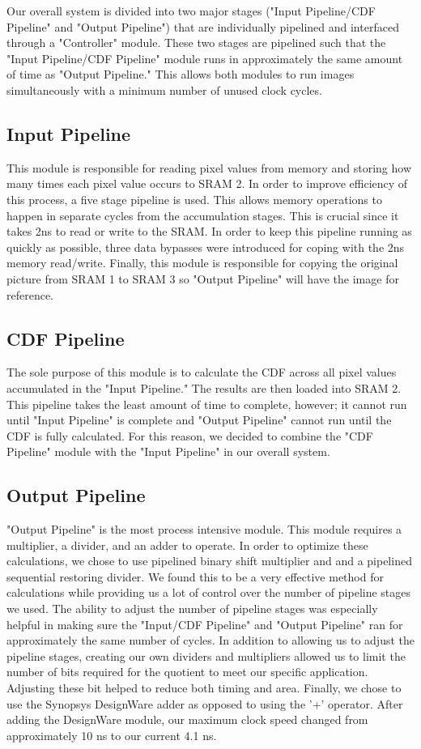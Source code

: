 \documentclass[10pt]{IEEEtran}
\begin{document}
Our overall system is divided into two major stages ("Input Pipeline/CDF Pipeline" and "Output Pipeline") that are individually pipelined and interfaced through a "Controller" module. These two stages are pipelined such that the "Input Pipeline/CDF Pipeline" module runs in approximately the same amount of time as "Output Pipeline." This allows both modules to run images simultaneously with a minimum number of unused clock cycles.

\subsection*{Input Pipeline}
This module is responsible for reading pixel values from memory and storing how many times each pixel value occurs to SRAM 2. In order to improve efficiency of this process, a five stage pipeline is used. This allows memory operations to happen in separate cycles from the accumulation stages. This is crucial since it takes 2ns to read or write to the SRAM. In order to keep this pipeline running as quickly as possible, three data bypasses were introduced for coping with the 2ns memory read/write. Finally, this module is responsible for copying the original picture from SRAM 1 to SRAM 3 so "Output Pipeline" will have the image for reference.

\subsection*{CDF Pipeline}
The sole purpose of this module is to calculate the CDF across all pixel values accumulated in the "Input Pipeline." The results are then loaded into SRAM 2. This pipeline takes the least amount of time to complete, however; it cannot run until "Input Pipeline" is complete and "Output Pipeline" cannot run until the CDF is fully calculated. For this reason, we decided to combine the "CDF Pipeline" module with the "Input Pipeline" in our overall system.

\subsection*{Output Pipeline}
"Output Pipeline" is the most process intensive module. This module requires a multiplier, a divider, and an adder to operate. In order to optimize these calculations, we chose to use pipelined binary shift multiplier and and a pipelined sequential restoring divider. We found this to be a very effective method for calculations while providing us a lot of control over the number of pipeline stages we used. The ability to adjust the number of pipeline stages was especially helpful in making sure the "Input/CDF Pipeline" and "Output Pipeline" ran for approximately the same number of cycles. In addition to allowing us to adjust the pipeline stages, creating our own dividers and multipliers allowed us to limit the number of bits required for the quotient to meet our specific application. Adjusting these bit helped to reduce both timing and area. Finally, we chose to use the Synopsys DesignWare adder as opposed to using the '+' operator. After adding the DesignWare module, our maximum clock speed changed from approximately 10 ns to our current 4.1 ns.
 
\end{document}
